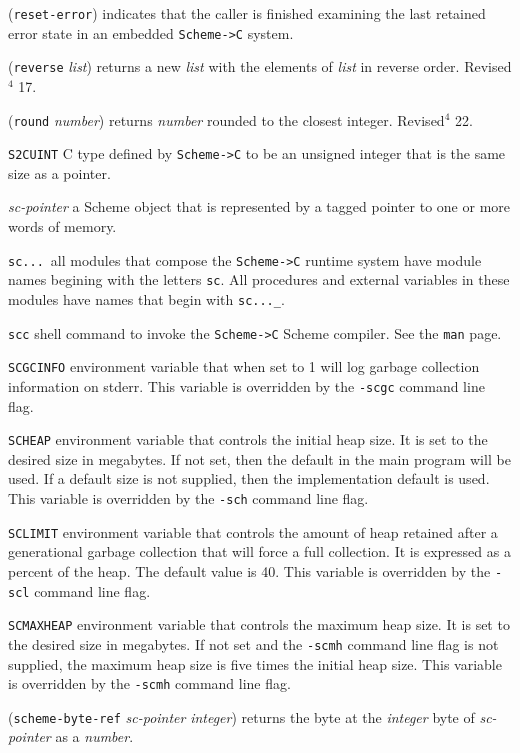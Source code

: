 \documentclass[10pt,twocolumn]{article}
\begin{document}
(\texttt{reset-error}) indicates that the caller is finished examining the
last retained error state in an embedded \texttt{Scheme->C} system.

(\texttt{reverse} \emph{list}) returns a new \emph{list} with the elements of
\emph{list} in reverse order.  Revised$^4$ 17.

(\texttt{round} \emph{number}) returns \emph{number} rounded to the closest
integer.  Revised$^4$ 22.

\texttt{S2CUINT} C type defined by \texttt{Scheme->C} to be an unsigned
integer that is the same size as a pointer.

\emph{sc-pointer} a Scheme object that is represented by a tagged
pointer to one or more words of memory.

\texttt{sc...}\ all modules that compose the \texttt{Scheme->C} runtime system
have module names begining with the letters \texttt{sc}.  All procedures
and external variables in these modules have names that begin with
\texttt{sc...\_}.

\texttt{scc} shell command to invoke the \texttt{Scheme->C} Scheme compiler.  See the
\texttt{man} page.

\texttt{SCGCINFO} environment variable that when set to 1 will log
garbage collection information on stderr.  This variable is
overridden by the \texttt{-scgc} command line flag.

\texttt{SCHEAP} environment variable that controls the initial heap size.
It is set to the desired size in megabytes.  If not set, then the
default in the main program will be used.  If a default size is not
supplied, then the implementation default is used.  This variable is
overridden by the \texttt{-sch} command line flag.

\texttt{SCLIMIT} environment variable that controls the amount of heap
retained after a generational garbage collection that will force a
full collection.  It is expressed as a percent of the heap.  The
default value is 40.  This variable is overridden by the
\texttt{-scl} command line flag.

\texttt{SCMAXHEAP} environment variable that controls the maximum heap
size.  It is set to the desired size in megabytes.  If not set and
the \texttt{-scmh} command line flag is not supplied, the maximum heap
size is five times the initial heap size. This variable is overridden
by the \texttt{-scmh} command line flag.

(\texttt{scheme-byte-ref} \emph{sc-pointer} \emph{integer}) returns the byte at
the \emph{integer} byte of \emph{sc-pointer} as a \emph{number}.
\end{document}
